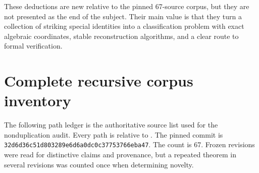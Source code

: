 \documentclass[11pt,oneside]{article}
\numberwithin{equation}{section}
\theoremstyle{definition}
\theoremstyle{remark}
\begin{document}
These deductions are new relative to the pinned 67-source corpus, but they are not presented
as the end of the subject.  Their main value is that they turn a collection of striking
special identities into a classification problem with exact algebraic coordinates, stable
reconstruction algorithms, and a clear route to formal verification.

\appendix
\section{Complete recursive corpus inventory}
\label{p1:app:inventory}

The following path ledger is the authoritative source list used for the nonduplication audit.
Every path is relative to .  The pinned commit is
\texttt{32d6d36c51d803289e6d6a0dc0c37753766eba47}.  The count is 67.  Frozen revisions were
read for distinctive claims and provenance, but a repeated theorem in several revisions was
counted once when determining novelty.
\end{document}
